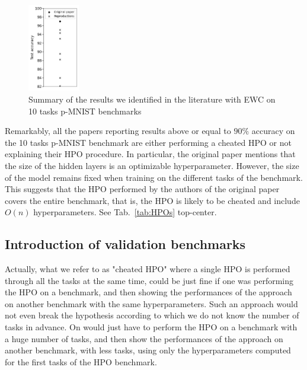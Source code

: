 \documentclass[11pt]{article}
\begin{document}
\begin{figure}
    \centering
    \includegraphics[width=0.20\textwidth]{images/EWCs.png}
    \caption{Summary of the results we identified in the literature with EWC on 10 tasks p-MNIST benchmarks \cite{EWC_0}\cite{EWC_1}\cite{EWC_2_measuring_cf}\cite{EWC_3}\cite{EWC_4_ref_romain}\cite{EWC_5}\cite{EWC_6_Adversarial_CL}\cite{EWC_7_frameworks_2}}
    \label{fig:EWCs}
\end{figure}

\vspace{2mm}
\noindent
Remarkably, all the papers reporting results above or equal to $90\%$ accuracy on the 10 tasks p-MNIST benchmark are either performing a cheated HPO or not explaining their HPO procedure. In particular, the original paper mentions that the size of the hidden layers is an optimizable hyperparameter. However, the size of the model remains fixed when training on the different tasks of the benchmark. This suggests that the HPO performed by the authors of the original paper covers the entire benchmark, that is, the HPO is likely to be cheated and include $O(n)$ hyperparameters. See Tab.~\ref{tab:HPOs} top-center.


\subsection{Introduction of validation benchmarks}


Actually, what we refer to as "cheated HPO" where a single HPO is performed through all the tasks at the same time, could be just fine if one was performing the HPO on a benchmark, and then showing the performances of the approach on another benchmark with the same hyperparameters. Such an approach would not even break the hypothesis according to which we do not know the number of tasks in advance. On would just have to perform the HPO on a benchmark with a huge number of tasks, and then show the performances of the approach on another benchmark, with less tasks, using only the hyperparameters computed for the first tasks of the HPO benchmark.
\end{document}

